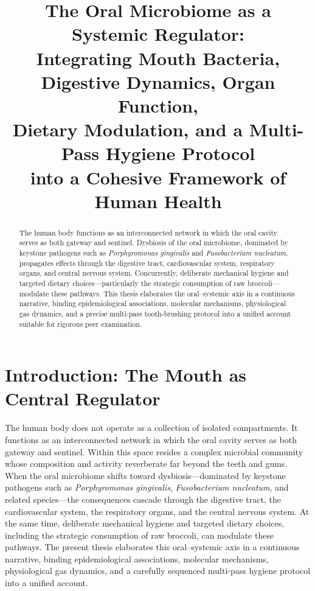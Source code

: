 \documentclass[11pt,a4paper]{article}
\title{The Oral Microbiome as a Systemic Regulator:\\[0.3em]
\large Integrating Mouth Bacteria, Digestive Dynamics, Organ Function,\\ 
Dietary Modulation, and a Multi-Pass Hygiene Protocol\\ 
into a Cohesive Framework of Human Health}
\author{}
\date{}
\begin{document}
\maketitle

\begin{abstract}
\noindent
The human body functions as an interconnected network in which the oral cavity serves as both gateway and sentinel. Dysbiosis of the oral microbiome, dominated by keystone pathogens such as \textit{Porphyromonas gingivalis} and \textit{Fusobacterium nucleatum}, propagates effects through the digestive tract, cardiovascular system, respiratory organs, and central nervous system. Concurrently, deliberate mechanical hygiene and targeted dietary choices---particularly the strategic consumption of raw broccoli---modulate these pathways. This thesis elaborates the oral--systemic axis in a continuous narrative, binding epidemiological associations, molecular mechanisms, physiological gas dynamics, and a precise multi-pass tooth-brushing protocol into a unified account suitable for rigorous peer examination.
\end{abstract}

\section{Introduction: The Mouth as Central Regulator}
The human body does not operate as a collection of isolated compartments. It functions as an interconnected network in which the oral cavity serves as both gateway and sentinel. Within this space resides a complex microbial community whose composition and activity reverberate far beyond the teeth and gums. When the oral microbiome shifts toward dysbiosis---dominated by keystone pathogens such as \textit{Porphyromonas gingivalis}, \textit{Fusobacterium nucleatum}, and related species---the consequences cascade through the digestive tract, the cardiovascular system, the respiratory organs, and the central nervous system. At the same time, deliberate mechanical hygiene and targeted dietary choices, including the strategic consumption of raw broccoli, can modulate these pathways. The present thesis elaborates this oral--systemic axis in a continuous narrative, binding epidemiological associations, molecular mechanisms, physiological gas dynamics, and a carefully sequenced multi-pass hygiene protocol into a unified account.
\end{document}

